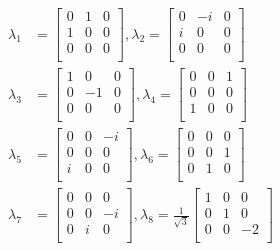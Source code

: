 \begin{align*}
    \lambda_1 &= \begin{bmatrix}
        0 & 1 & 0 \\
        1 & 0 & 0 \\
        0 & 0 & 0 \\
    \end{bmatrix}, \lambda_2 = \begin{bmatrix}
        0 & -i & 0 \\
        i & 0 & 0 \\
        0 & 0 & 0 \\
    \end{bmatrix}\\
    \lambda_3 &= \begin{bmatrix}
        1 & 0 & 0 \\
        0 & -1 & 0 \\
        0 & 0 & 0 \\
    \end{bmatrix}, \lambda_4 = \begin{bmatrix}
        0 & 0 & 1 \\
        0 & 0 & 0 \\
        1 & 0 & 0 \\
    \end{bmatrix} \\
    \lambda_5 &= \begin{bmatrix}
        0 & 0 & -i \\
        0 & 0 & 0 \\
        i & 0 & 0 \\
    \end{bmatrix}, \lambda_6 = \begin{bmatrix}
        0 & 0 & 0 \\
        0 & 0 & 1 \\
        0 & 1 & 0 \\
    \end{bmatrix} \\
    \lambda_7 &= \begin{bmatrix}
        0 & 0 & 0 \\
        0 & 0 & -i \\
        0 & i & 0 \\
    \end{bmatrix}, \lambda_8 = \frac{1}{\sqrt{3}}\begin{bmatrix}
        1 & 0 & 0 \\
        0 & 1 & 0 \\
        0 & 0 & -2 \\
    \end{bmatrix} \\
\end{align*}

